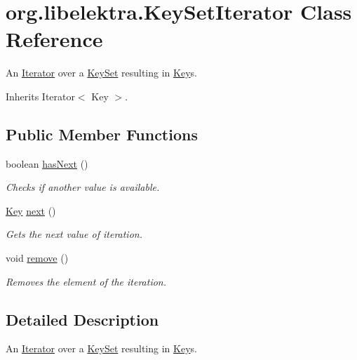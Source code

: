 \hypertarget{classorg_1_1libelektra_1_1KeySetIterator}{}\section{org.\+libelektra.\+Key\+Set\+Iterator Class Reference}
\label{classorg_1_1libelektra_1_1KeySetIterator}


An \hyperlink{}{Iterator} over a \hyperlink{classorg_1_1libelektra_1_1KeySet}{Key\+Set} resulting in \hyperlink{classorg_1_1libelektra_1_1Key}{Key}s.  




Inherits Iterator$<$ Key $>$.

\subsection*{Public Member Functions}
\begin{DoxyCompactItemize}
\item 
boolean \hyperlink{classorg_1_1libelektra_1_1KeySetIterator_a5e1ac38d123fdf1613f9a9258ef009a7}{has\+Next} ()
\begin{DoxyCompactList}\small\item\em Checks if another value is available. \end{DoxyCompactList}\item 
\hyperlink{classorg_1_1libelektra_1_1Key}{Key} \hyperlink{classorg_1_1libelektra_1_1KeySetIterator_aaa1cd283e898fd4c96ec44faade6effd}{next} ()
\begin{DoxyCompactList}\small\item\em Gets the next value of iteration. \end{DoxyCompactList}\item 
\mbox{\label{classorg_1_1libelektra_1_1KeySetIterator_acc5e88865016b39a9f5c255935615255}} 
void \hyperlink{classorg_1_1libelektra_1_1KeySetIterator_acc5e88865016b39a9f5c255935615255}{remove} ()
\begin{DoxyCompactList}\small\item\em Removes the element of the iteration. \end{DoxyCompactList}\end{DoxyCompactItemize}


\subsection{Detailed Description}
An \hyperlink{}{Iterator} over a \hyperlink{classorg_1_1libelektra_1_1KeySet}{Key\+Set} resulting in \hyperlink{classorg_1_1libelektra_1_1Key}{Key}s. 

